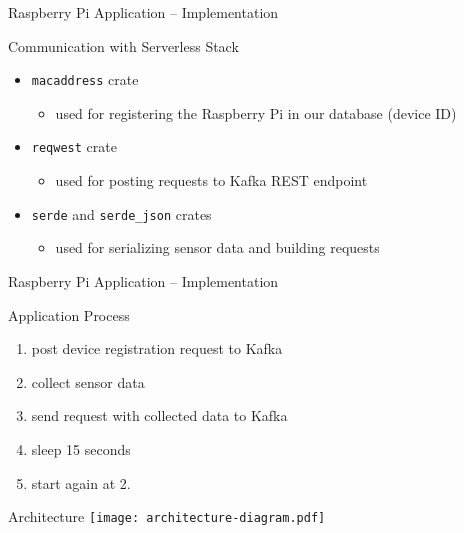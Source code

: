 \documentclass[aspectratio=169]{beamer}
\begin{document}
  \begin{frame}{Raspberry Pi Application -- Implementation}
    \begin{block}{Communication with Serverless Stack}
      \begin{itemize}
        \item \texttt{macaddress} crate
          \begin{itemize}
            \item used for registering the Raspberry Pi in our database (device ID)
          \end{itemize}
        \item \texttt{reqwest} crate
          \begin{itemize}
            \item used for posting requests to Kafka REST endpoint
          \end{itemize}
        \item \texttt{serde} and \texttt{serde\_json} crates
          \begin{itemize}
            \item used for serializing sensor data and building requests
          \end{itemize}
      \end{itemize}
    \end{block}
  \end{frame}

  \begin{frame}{Raspberry Pi Application -- Implementation}
    \begin{block}{Application Process}
      \begin{enumerate}
        \item post device registration request to Kafka
        \item collect sensor data
        \item send request with collected data to Kafka
        \item sleep 15 seconds
        \item start again at 2.
      \end{enumerate}
    \end{block}
  \end{frame}

  \begin{frame}{Architecture}
    \centering
    \vfill
    \texttt{[image: architecture-diagram.pdf]}
  \end{frame}
\end{document}
